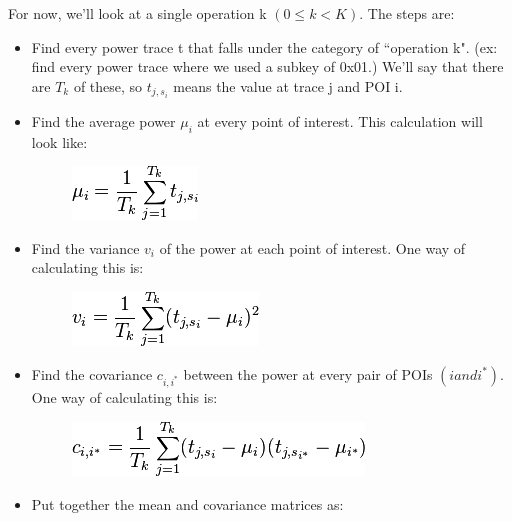     For now, we'll look at a single operation k $(0 \le k < K)$. The steps are:
    \begin{itemize}
      \item Find every power trace t that falls under the category of
      ``operation k". (ex: find every power trace where we used a subkey of
      0x01.) We'll say that there are $T_k$ of these, so $t_{j, s_i}$ means the
      value at trace j and POI i.
      \item Find the average power $\mu_i$ at every point of interest. This
      calculation will look like:
      \begin{figure}[htp]
      \centering
      \includegraphics[scale=0.7]{images/Lecture_5/pc1.png}
      \end{figure}
       
      \item Find the variance $v_i$ of the power at each point of interest. One
      way of calculating this is:
      \begin{figure}[htp]
      \centering
      \includegraphics[scale=0.7]{images/Lecture_5/pic2.png}
      \end{figure}
    
      \item Find the covariance $c_{i, i^*}$ between the power at every pair of
      POIs $(i and i^*)$. One way of calculating this is:
      \begin{figure}[htp]
      \centering
      \includegraphics[scale=0.7]{images/Lecture_5/pic3.png}
      \end{figure}
      \item Put together the mean and covariance matrices as:
    

\end{itemize}
